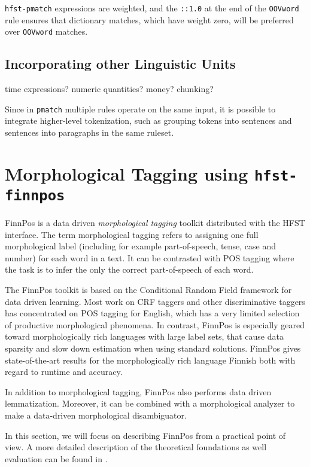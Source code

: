 \documentclass{llncs}
\begin{document}
\verb+hfst-pmatch+ expressions are weighted, and the \verb+::1.0+ at the end
of the \verb+OOVword+ rule ensures that dictionary matches, which have
weight zero, will be preferred over \verb+OOVword+ matches.

\subsection{Incorporating other Linguistic Units}

time expressions? numeric quantities? money? chunking?

Since in \verb+pmatch+ multiple rules operate on the same input, it is possible
to integrate higher-level tokenization, such as grouping tokens into sentences
and sentences into paragraphs in the same ruleset.

\section{Morphological Tagging using {\tt hfst-finnpos}}\label{sec:morph-tagging}

FinnPos \cite{silfverberg/2015} is a data driven {\it morphological
  tagging} toolkit distributed with the HFST interface. The term
morphological tagging \cite{chrupala/2008} refers to assigning one full
morphological label (including for example part-of-speech, tense, case
and number) for each word in a text. It can be contrasted with POS
tagging where the task is to infer the only the correct part-of-speech
of each word.

The FinnPos toolkit is based on the Conditional Random Field framework
\cite{lafferty/2001} for data driven learning. Most work on CRF
taggers and other discriminative taggers has concentrated on POS
tagging for English, which has a very limited selection of productive
morphological phenomena. In contrast, FinnPos is especially geared
toward morphologically rich languages with large label sets, that
cause data sparsity and slow down estimation when using standard
solutions. FinnPos gives state-of-the-art results for the
morphologically rich language Finnish \cite{silfverberg/2015} both
with regard to runtime and accuracy.

In addition to morphological tagging, FinnPos also performs data
driven lemmatization. Moreover, it can be combined with a
morphological analyzer to make a data-driven morphological
disambiguator.

In this section, we will focus on describing FinnPos from a
practical point of view. A more detailed description of the theoretical foundations as well evaluation can be found in
\cite{silfverberg/2015}.
\end{document}
